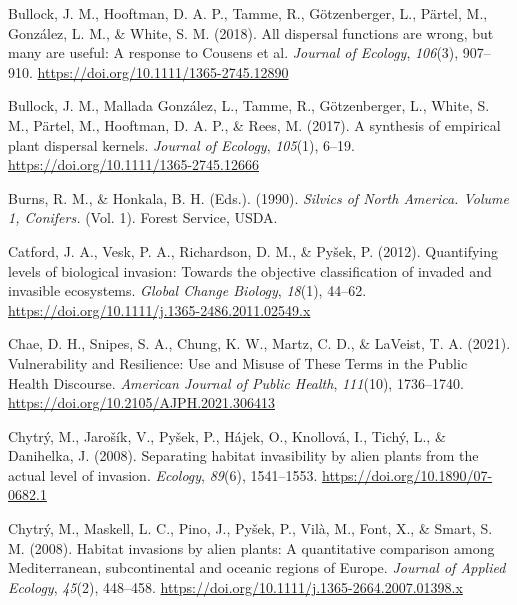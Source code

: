 \documentclass[
]{article}
\newlength{\cslhangindent}
\newenvironment{CSLReferences}[2] %
 {\begin{list}{}{%
  \setlength{\itemindent}{0pt}
  \setlength{\leftmargin}{0pt}
  \setlength{\parsep}{0pt}
  \ifodd #1
   \setlength{\leftmargin}{\cslhangindent}
   \setlength{\itemindent}{-1\cslhangindent}
  \fi
  \setlength{\itemsep}{#2\baselineskip}}}
 {\end{list}}
\begin{document}
\begin{CSLReferences}{1}{0}
Bullock, J. M., Hooftman, D. A. P., Tamme, R., Götzenberger, L., Pärtel, M., González, L. M., \& White, S. M. (2018). All dispersal functions are wrong, but many are useful: {A} response to {Cousens} et al. \emph{Journal of Ecology}, \emph{106}(3), 907--910. \url{https://doi.org/10.1111/1365-2745.12890}

Bullock, J. M., Mallada González, L., Tamme, R., Götzenberger, L., White, S. M., Pärtel, M., Hooftman, D. A. P., \& Rees, M. (2017). A synthesis of empirical plant dispersal kernels. \emph{Journal of Ecology}, \emph{105}(1), 6--19. \url{https://doi.org/10.1111/1365-2745.12666}

Burns, R. M., \& Honkala, B. H. (Eds.). (1990). \emph{Silvics of {North America}. {Volume} 1, {Conifers}.} (Vol. 1). {Forest Service, USDA}.

Catford, J. A., Vesk, P. A., Richardson, D. M., \& Pyšek, P. (2012). Quantifying levels of biological invasion: Towards the objective classification of invaded and invasible ecosystems. \emph{Global Change Biology}, \emph{18}(1), 44--62. \url{https://doi.org/10.1111/j.1365-2486.2011.02549.x}

Chae, D. H., Snipes, S. A., Chung, K. W., Martz, C. D., \& LaVeist, T. A. (2021). Vulnerability and {Resilience}: {Use} and {Misuse} of {These Terms} in the {Public Health Discourse}. \emph{American Journal of Public Health}, \emph{111}(10), 1736--1740. \url{https://doi.org/10.2105/AJPH.2021.306413}

Chytrý, M., Jarošík, V., Pyšek, P., Hájek, O., Knollová, I., Tichý, L., \& Danihelka, J. (2008). Separating habitat invasibility by alien plants from the actual level of invasion. \emph{Ecology}, \emph{89}(6), 1541--1553. \url{https://doi.org/10.1890/07-0682.1}

Chytrý, M., Maskell, L. C., Pino, J., Pyšek, P., Vilà, M., Font, X., \& Smart, S. M. (2008). Habitat invasions by alien plants: A quantitative comparison among {Mediterranean}, subcontinental and oceanic regions of {Europe}. \emph{Journal of Applied Ecology}, \emph{45}(2), 448--458. \url{https://doi.org/10.1111/j.1365-2664.2007.01398.x}


\end{CSLReferences}
\end{document}
